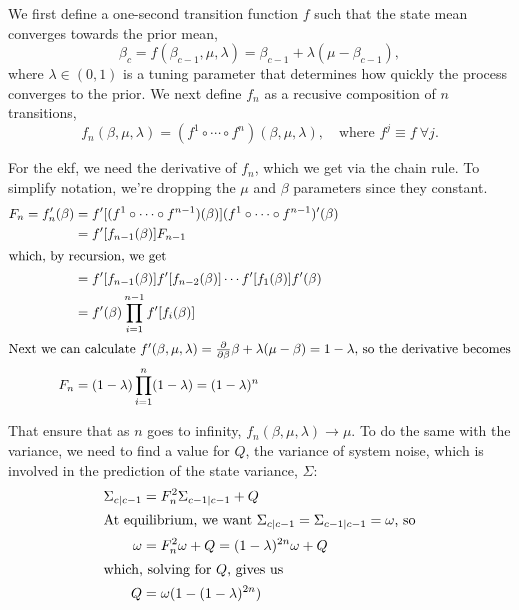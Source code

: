 \documentclass[draftcls,a4paper,onecolumn]{IEEEtran}\usepackage[]{graphicx}\usepackage[]{color}
\begin{document}
We first define a one-second transition function $f$ such that the state mean
converges towards the prior mean,
\begin{equation}
  \label{eq:kf_trans1}
  \beta_{c} = f(\beta_{c-1}, \mu, \lambda) = \beta_{c-1} + \lambda(\mu - \beta_{c-1}),
\end{equation}
where $\lambda \in (0, 1)$ is a tuning parameter that determines how quickly
the process converges to the prior.
We next define $f_n$ as a recusive composition of $n$ transitions,
\begin{equation}
  \label{eq:kf_transf}
f_n(\beta, \mu, \lambda) =
(f^1\circ \cdots \circ f^n) (\beta, \mu, \lambda),\quad
\text{where } f^j \equiv f\ \forall j.
\end{equation}

For the \gls{ekf}, we need the derivative of $f_n$, which we get via the chain rule.
To simplify notation, we're dropping the $\mu$ and $\beta$ parameters since they constant.
\begin{align}
  \label{eq:kf_deriv}
  F_n = f_n'(\beta)\nonumber
    &= f'[(f^1\circ \cdots \circ f^{n-1})(\beta)]
      (f^1\circ \cdots \circ f^{n-1})'(\beta) \nonumber \\
    &= f'[f_{n-1}(\beta)] F_{n-1} \nonumber \\
  \intertext{which, by recursion, we get}
    &= f'[f_{n-1}(\beta)] f'[f_{n-2}(\beta)] \cdots f'[f_1(\beta)] f'(\beta) \nonumber \\
    &= f'(\beta) \prod_{i=1}^{n-1} f'[f_i(\beta)] \nonumber \\
  \intertext{Next we can calculate 
  $f'(\beta, \mu, \lambda) = \frac{\partial}{\partial \beta} \beta + \lambda(\mu - \beta) = 1 - \lambda$,
  so the derivative becomes}
    F_n &= (1-\lambda) \prod_{i=1}^n (1 - \lambda) = (1-\lambda)^n
\end{align}

That ensure that as $n$ goes to infinity, $f_n(\beta, \mu, \lambda) \to \mu$.
To do the same with the variance, we need to find a value for $Q$,
the variance of system noise, which is involved in the prediction of the state variance, $\Sigma$:
\begin{align}
  \label{eq:kf_varpred}
  \Sigma_{c|c-1} &= F_n^2\Sigma_{c-1|c-1} + Q \nonumber \\
  \intertext{At equilibrium, we want $\Sigma_{c|c-1} = \Sigma_{c-1|c-1} = \omega$, so}
  \omega &= F_n^2 \omega + Q = (1-\lambda)^{2n} \omega + Q \nonumber \\
  \intertext{which, solving for $Q$, gives us}
  Q &= \omega(1 - (1 - \lambda)^{2n})
\end{align}
\end{document}
